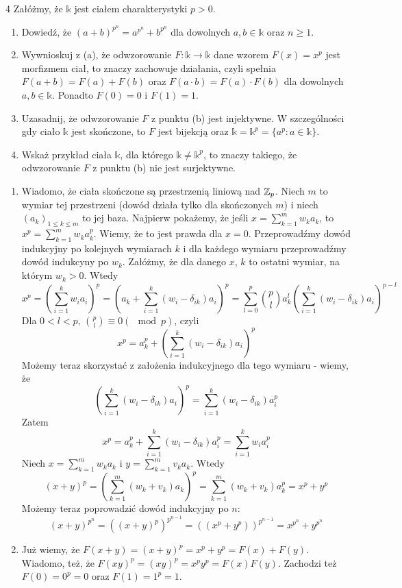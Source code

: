 \documentclass{../note}
\begin{document}
\begin{zadanie}{4}
Załóżmy, że $\mathbb{k}$ jest ciałem charakterystyki $p>0$.
\begin{enumerate}
    \item[(a)] Dowiedź, że $(a+b)^{p^{n}}=a^{p^{n}}+b^{p^{n}}$ dla dowolnych $a, b\in\mathbb{k}$ oraz $n\ge 1$.
    \item[(b)] Wywnioskuj z (a), że odwzorowanie $F:\mathbb{k}\rightarrow\mathbb{k}$ dane wzorem $F(x)=x^{p}$ jest morfizmem ciał, to znaczy zachowuje działania, czyli spełnia $F(a+b)=F(a)+F(b)$ oraz $F(a\cdot b)=F(a)\cdot F(b)$ dla dowolnych $a, b\in\mathbb{k}$. Ponadto $F(0)=0$ i $F(1)=1$.
    \item[(c)] Uzasadnij, że odwzorowanie $F$ z punktu (b) jest injektywne. W szczególności gdy ciało $\mathbb{k}$ jest skończone, to $F$ jest bijekcją oraz $\mathbb{k}=\mathbb{k}^{p}=\{a^{p}:a\in\mathbb{k}\}$.
    \item[(d)] Wskaż przykład ciała $\mathbb{k}$, dla którego $\mathbb{k}\ne\mathbb{k}^{p}$, to znaczy takiego, że odwzorowanie $F$ z punktu (b) nie jest surjektywne.
\end{enumerate}
\end{zadanie}
\begin{rozwiazanie}
\begin{enumerate}[label=(\alph*)]
    \item Wiadomo, że ciała skończone są przestrzenią liniową nad $\mathbb{Z}_p$. Niech $m$ to wymiar tej przestrzeni (dowód działa tylko dla skończonych $m$) i niech $(a_k)_{1 \leq k \leq m}$ to jej baza. Najpierw pokażemy, że jeśli $x = \sum_{k=1}^{m} w_ka_k$, to $x^p = \sum_{k=1}^{m} w_ka_k^p$. Wiemy, że to jest prawda dla $x = 0$. Przeprowadźmy dowód indukcyjny po kolejnych wymiarach $k$ i dla każdego wymiaru przeprowadźmy dowód indukcyny po $w_k$. Załóżmy, że dla danego $x$, $k$ to ostatni wymiar, na którym $w_k > 0$. Wtedy
    \[x^p = \left(\sum_{i = 1}^{k} w_ia_i\right)^p = \left(a_k + \sum_{i = 1}^{k} (w_i-\delta_{ik})a_i\right)^p = \sum_{l=0}^{p} \binom{p}{l}a_k^l\left(\sum_{i = 1}^{k} (w_i-\delta_{ik})a_i\right)^{p-l}\]
    Dla $0 < l < p$, $\binom{p}{l} \equiv 0 (\mod p)$, czyli
    \[x^p = a_k^p + \left(\sum_{i = 1}^{k} (w_i-\delta_{ik})a_i\right)^p\]
    Możemy teraz skorzystać z założenia indukcyjnego dla tego wymiaru - wiemy, że 
    \[\left(\sum_{i = 1}^{k} (w_i-\delta_{ik})a_i\right)^p = \sum_{i = 1}^{k} (w_i-\delta_{ik})a_i^p\]
    Zatem
    \[x^p = a_k^p + \sum_{i = 1}^{k} (w_i-\delta_{ik})a_i^p = \sum_{i = 1}^{k} w_ia_i^p\]
    Niech $x = \sum_{k=1}^{m} w_ka_k$ i $y = \sum_{k=1}^{m} v_ka_k$. Wtedy 
    \[(x + y)^p = \left(\sum_{k=1}^{m} (w_k+v_k)a_k\right)^p = \sum_{k=1}^{m} (w_k+v_k)a_k^p = x^p + y^p\]
    Możemy teraz poprowadzić dowód indukcyjny po $n$:
    \[(x + y)^{p^n} = \left((x + y)^p\right)^{p^{n-1}} = \left((x^p + y^p)\right)^{p^{n-1}} = x^{p^n} + y^{p^n}\]
    \item Już wiemy, że $F(x + y) = (x + y)^p = x^p + y^p = F(x) + F(y)$. Wiadomo, też, że $F(xy)^p = (xy)^p = x^py^p = F(x)F(y)$. Zachodzi też $F(0) = 0^p = 0$ oraz $F(1) = 1^p = 1$.
\end{enumerate}
\end{rozwiazanie}
\end{document}
